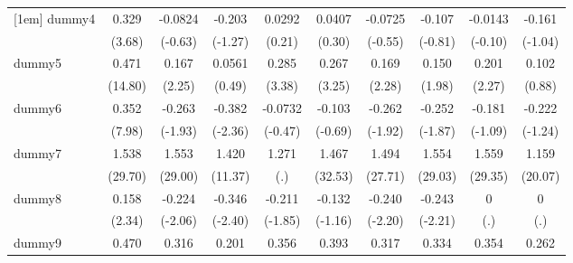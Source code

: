 {\begin{tabular}{l*{9}{c}}
[1em]
dummy4      &       0.329\sym{***}&     -0.0824         &      -0.203         &      0.0292         &      0.0407         &     -0.0725         &      -0.107         &     -0.0143         &      -0.161         \\
            &      (3.68)         &     (-0.63)         &     (-1.27)         &      (0.21)         &      (0.30)         &     (-0.55)         &     (-0.81)         &     (-0.10)         &     (-1.04)         \\
[1em]
dummy5      &       0.471\sym{***}&       0.167\sym{*}  &      0.0561         &       0.285\sym{***}&       0.267\sym{**} &       0.169\sym{*}  &       0.150\sym{*}  &       0.201\sym{*}  &       0.102         \\
            &     (14.80)         &      (2.25)         &      (0.49)         &      (3.38)         &      (3.25)         &      (2.28)         &      (1.98)         &      (2.27)         &      (0.88)         \\
[1em]
dummy6      &       0.352\sym{***}&      -0.263         &      -0.382\sym{*}  &     -0.0732         &      -0.103         &      -0.262         &      -0.252         &      -0.181         &      -0.222         \\
            &      (7.98)         &     (-1.93)         &     (-2.36)         &     (-0.47)         &     (-0.69)         &     (-1.92)         &     (-1.87)         &     (-1.09)         &     (-1.24)         \\
[1em]
dummy7      &       1.538\sym{***}&       1.553\sym{***}&       1.420\sym{***}&       1.271         &       1.467\sym{***}&       1.494\sym{***}&       1.554\sym{***}&       1.559\sym{***}&       1.159\sym{***}\\
            &     (29.70)         &     (29.00)         &     (11.37)         &         (.)         &     (32.53)         &     (27.71)         &     (29.03)         &     (29.35)         &     (20.07)         \\
[1em]
dummy8      &       0.158\sym{*}  &      -0.224\sym{*}  &      -0.346\sym{*}  &      -0.211         &      -0.132         &      -0.240\sym{*}  &      -0.243\sym{*}  &           0         &           0         \\
            &      (2.34)         &     (-2.06)         &     (-2.40)         &     (-1.85)         &     (-1.16)         &     (-2.20)         &     (-2.21)         &         (.)         &         (.)         \\
[1em]
dummy9      &       0.470\sym{***}&       0.316\sym{***}&       0.201         &       0.356\sym{***}&       0.393\sym{***}&       0.317\sym{***}&       0.334\sym{***}&       0.354\sym{***}&       0.262\sym{**} \\

\end{tabular}}
